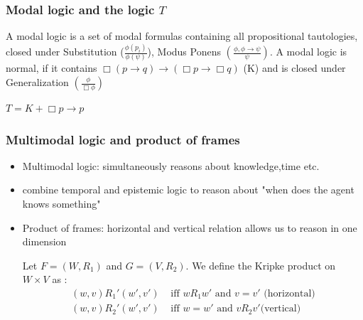 \documentclass[hyperref={pdfpagelabels=false},t,10pt]{beamer}
\begin{document}
\begin{frame}
  \frametitle{Modal logic and the logic $T$}
  \begin{definition}
    A modal logic is a set of modal formulas containing all propositional tautologies, closed under Substitution ($\frac{\phi(p_i)}{\phi(\psi)}$), Modus Ponens $(\frac{\phi, \phi \rightarrow \psi}{\psi})$. \newline \newline \pause
    A modal logic is normal, if it contains $\Box (p \rightarrow q) \rightarrow (\Box p \rightarrow \Box q)$ (K) and is closed under Generalization $(\frac{\phi}{\Box \phi})$
  \end{definition}

  \begin{definition}
      $T = K + \Box p \rightarrow p$
  \end{definition}
\end{frame}



\begin{frame}
  \frametitle{Multimodal logic and product of frames}
  \begin{itemize}
    \item Multimodal logic: simultaneously reasons about knowledge,time etc. 
    \item combine temporal and epistemic logic to reason about "when does the agent knows something" \pause %
    \item Product of frames: horizontal and vertical relation allows us to reason in one dimension \pause%
    \begin{definition}
      Let $F = (W, R_1)$ and $G = (V, R_2)$. We define the Kripke product on $W \times V$ as : 
        \begin{align*}
              (w,v)R_1'(w',v') &\text{ iff } wR_1w' \mbox{ and } v = v' \text{  (horizontal)} \\
              (w,v)R_2  '(w',v') &\text{ iff } w = w' \mbox{ and } vR_2v' \text{(vertical)}
      \end{align*}  
    \end{definition}




  \end{itemize}
\end{frame}
\end{document}
